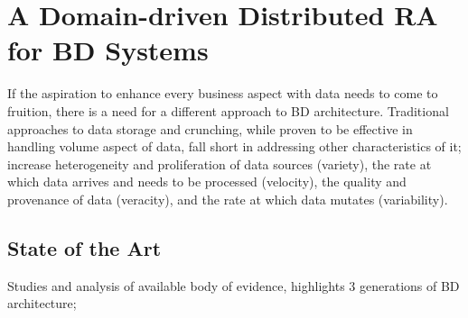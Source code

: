 \documentclass[runningheads]{llncs}
\begin{document}
\section{A Domain-driven Distributed RA for BD Systems}

If the aspiration to enhance every business aspect with data needs to come to fruition, there is a need for a different approach to BD architecture. Traditional approaches to data storage and crunching, while proven to be effective in handling volume aspect of data, fall short in addressing other characteristics of it; increase heterogeneity and proliferation of data sources (variety), the rate at which data arrives and needs to be processed (velocity), the quality and provenance of data (veracity), and the rate at which data mutates (variability).

\subsection{State of the Art}

 Studies and analysis of available body of evidence, highlights 3 generations of BD architecture;
\end{document}
